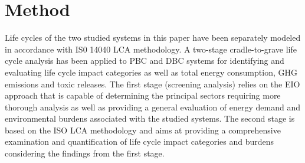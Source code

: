 \documentclass[conference]{IEEEtran}
\begin{document}
\section{Method}

Life cycles of the two studied systems in this paper have been separately modeled in accordance with IS0 14040 LCA methodology. A two-stage cradle-to-grave life cycle analysis has been applied to PBC and DBC systems for identifying and evaluating life cycle impact categories as well as  total energy consumption, GHG emissions and toxic releases. The first stage (screening analysis) relies on the EIO approach that is capable of determining the principal sectors requiring more thorough analysis as well as providing a general evaluation of energy demand and environmental burdens associated with the studied systems. The second stage is based on the ISO LCA methodology and aims at providing a comprehensive examination and quantification of life cycle impact categories and burdens considering the findings from the first stage. 

\end{document}
